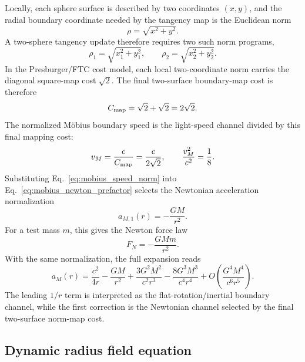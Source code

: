 \documentclass[11pt,a4paper]{article}
\begin{document}
Locally, each sphere surface is described by two coordinates $(x,y)$, and the
radial boundary coordinate needed by the tangency map is the Euclidean norm
\begin{equation}
  \rho=\sqrt{x^2+y^2}.
  \label{eq:surface_norm}
\end{equation}
A two-sphere tangency update therefore requires two such norm programs,
\begin{equation}
  \rho_1=\sqrt{x_1^2+y_1^2},\qquad
  \rho_2=\sqrt{x_2^2+y_2^2}.
\end{equation}
In the Presburger/FTC cost model, each local two-coordinate norm carries the
diagonal square-map cost $\sqrt2$.  The final two-surface boundary-map cost is
therefore
\begin{equation}
  C_{\rm map}=\sqrt2+\sqrt2=2\sqrt2.
  \label{eq:two_sqrt_cost}
\end{equation}
The normalized M\"obius boundary speed is the light-speed channel divided by
this final mapping cost:
\begin{equation}
  v_M=\frac{c}{C_{\rm map}}=\frac{c}{2\sqrt2},
  \qquad
  \frac{v_M^2}{c^2}=\frac{1}{8}.
  \label{eq:mobius_speed_norm}
\end{equation}
Substituting Eq.~\eqref{eq:mobius_speed_norm} into
Eq.~\eqref{eq:mobius_newton_prefactor} selects the Newtonian acceleration
normalization
\begin{equation}
  \boxed{a_{M,1}(r)=-\frac{GM}{r^2}.}
  \label{eq:newton_from_mobius}
\end{equation}
For a test mass $m$, this gives the Newton force law
\begin{equation}
  \boxed{F_N=-\frac{GMm}{r^2}.}
  \label{eq:newton_force}
\end{equation}
With the same normalization, the full expansion reads
\begin{equation}
  a_M(r)=\frac{c^2}{4r}-\frac{GM}{r^2}
  +\frac{3G^2M^2}{c^2r^3}
  -\frac{8G^3M^3}{c^4r^4}
  +O\!\left(\frac{G^4M^4}{c^6r^5}\right).
  \label{eq:mobius_normalized_expansion}
\end{equation}
The leading $1/r$ term is interpreted as the flat-rotation/inertial boundary
channel, while the first correction is the Newtonian channel selected by the
final two-surface norm-map cost.

\subsection{Dynamic radius field equation}
\end{document}
